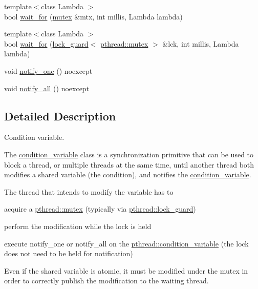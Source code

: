 \begin{DoxyCompactItemize}
{\footnotesize template$<$class Lambda $>$ }\\bool \hyperlink{classpthread_1_1condition__variable_a82fb3ff516ffef37c68f58e277fad855}{wait\+\_\+for} (\hyperlink{classpthread_1_1mutex}{mutex} \&mtx, int millis, Lambda lambda)
\item 
{\footnotesize template$<$class Lambda $>$ }\\bool \hyperlink{classpthread_1_1condition__variable_a5ee32edbf76592ec443e2544ecba811a}{wait\+\_\+for} (\hyperlink{classpthread_1_1lock__guard}{lock\+\_\+guard}$<$ \hyperlink{classpthread_1_1mutex}{pthread\+::mutex} $>$ \&lck, int millis, Lambda lambda)
\item 
void \hyperlink{classpthread_1_1condition__variable_ae374b1e852f36fc5eac93ad90d9fc85a}{notify\+\_\+one} () noexcept
\item 
void \hyperlink{classpthread_1_1condition__variable_ae40f0c9043ed693317bb9a07861efc65}{notify\+\_\+all} () noexcept
\end{DoxyCompactItemize}


\subsection{Detailed Description}
Condition variable.

The \hyperlink{classpthread_1_1condition__variable}{condition\+\_\+variable} class is a synchronization primitive that can be used to block a thread, or multiple threads at the same time, until another thread both modifies a shared variable (the condition), and notifies the \hyperlink{classpthread_1_1condition__variable}{condition\+\_\+variable}.

The thread that intends to modify the variable has to
\begin{DoxyItemize}
\item acquire a \hyperlink{classpthread_1_1mutex}{pthread\+::mutex} (typically via \hyperlink{classpthread_1_1lock__guard}{pthread\+::lock\+\_\+guard})
\item perform the modification while the lock is held
\item execute notify\+\_\+one or notify\+\_\+all on the \hyperlink{classpthread_1_1condition__variable}{pthread\+::condition\+\_\+variable} (the lock does not need to be held for notification)
\end{DoxyItemize}

Even if the shared variable is atomic, it must be modified under the mutex in order to correctly publish the modification to the waiting thread.

